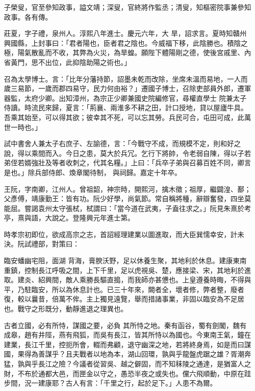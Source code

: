 \begin{pinyinscope}
 子榮叟，官至參知政事，謚文靖；深叟，官終將作監丞；清叟，知樞密院事兼參知政事。各有傳。



 莊夏，字子禮，泉州人。淳熙八年進士。慶元六年，大
 旱，詔求言。夏時知贛州興國縣，上封事曰：「君者陽也，臣者君之陰也。今威福下移，此陰勝也。積陰之極，陽氣散亂而不收，其弊為火災，為旱蝗。願陛下體陽剛之德，使後宮戚里、內省黃門，思不出位，此抑陰助陽之術也。」



 召為太學博士。言：「比年分藩持節，詔墨未乾而改除，坐席未溫而易地，一人而歲三易節，一歲而郡四易守，民力何由裕？」遷國子博士，召除吏部員外郎，遷軍器監，太府少卿。出知漳州，為宗正少卿兼國史院編修官，尋權直學士
 院兼太子侍讀。時流民來歸，夏言：「荊襄、兩淮多不耕之田，計口授地，貸以屋廬牛具。吾乘其始至，可以得其欲；彼幸其不死，可以忘其勞。兵民可合，屯田可成，此萬世一時也。」



 試中書舍人兼太子右庶子、左諭德，言：「今戰守不成，而規模不定，則和好之說，得以乘間而入。今日之患，莫大於兵冗。乞行下將帥，令老弱自陳，得以子若弟侄若婿強壯及等者收刺之，代其名糧。」上曰：「兵卒子弟與召募百姓不同，卿言是也。」除兵部侍郎、煥章閣待制，
 與祠歸。嘉定十年卒。



 王阮，字南卿，江州人。曾祖韶，神宗時，開熙河，擒木徵；祖厚，繼闢湟、鄯；父彥傅，靖康勤王：皆有功。阮少好學，尚氣節。常自稱將種，辭辯奮發，四坐莫能屈。嘗謁袁州太守張栻，栻謂曰：「當今道在武夷，子盍往求之。」阮見朱熹於考亭，熹與語，大說之。登隆興元年進士第。



 時孝宗初即位，欲成高宗之志，首詔經理建業以圖進取，而大臣巽懦幸安，計未決。阮試禮部，對策曰：



 臨安蟠幽宅阻，面湖
 背海，膏腴沃野，足以休養生聚，其地利於休息。建康東南重鎮，控制長江呼吸之間，上下千里，足以虎視吳、楚，應接梁、宋，其地利於進取。建炎、紹興間，敵人乘勝長驅直搗，而我師亦甚憊也。上皇遵養時晦，不得與平，乃駐臨安，所以為休息計也。已三十年來，闕者全，壞者修，弊者整，廢者復，較以曩昔，倍萬不侔。主上獨見遠覽，舉而措諸事業，非固以臨安為不足居也。戰守之形既分，動靜進退之理異也。



 古者立國，必有所恃，謀國之要，必負
 其所恃之地。秦有函谷，蜀有劍閣，魏有成皋，趙有井陘，燕有飛狐，而吳有長江，皆其所恃以為國也。今東南王氣，鐘在建業，長江千里，控扼所會，輟而弗顧，退守幽深之地，若將終身焉，如是而曰謀國，果得為善謀乎？且夫戰者以地為本，湖山回環，孰與乎龍盤虎踞之雄？胥潮奔猛，孰與乎長江之險？今議者從習吳、越之僻固，而不知秣陵之通達，是猶富人之財，不布於通都大邑，而匣金以守之，愚恐半夜之或失也。儻六飛順動，中原在跬
 步間，況一建康耶？古人有言：「千里之行，起於足下。」人患不為爾。




\end{pinyinscope}
